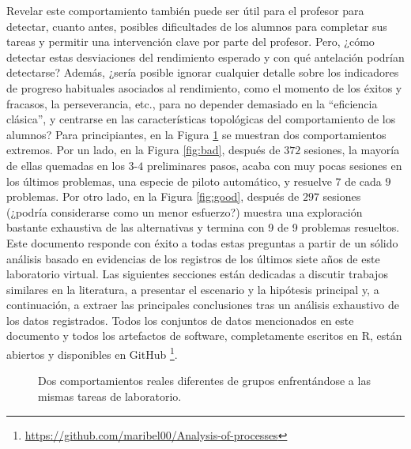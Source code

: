 Revelar este comportamiento también puede ser útil para el profesor para detectar, cuanto antes, posibles dificultades de los alumnos para completar sus tareas y permitir una intervención clave por parte del profesor. Pero, ¿cómo detectar estas desviaciones del rendimiento esperado y con qué antelación podrían detectarse? Además, ¿sería posible ignorar cualquier detalle sobre los indicadores de progreso habituales asociados al rendimiento, como el momento de los éxitos y fracasos, la perseverancia, etc., para no depender demasiado en la ``eficiencia clásica'', y centrarse en las características topológicas del comportamiento de los alumnos? Para principiantes, en la Figura \ref{fig:extreme} se muestran dos comportamientos extremos. Por un lado, en la Figura \ref{fig:bad}, después de $372$ sesiones, la mayoría de ellas quemadas en los $3$-$4$ preliminares pasos, acaba con muy pocas sesiones en los últimos problemas, una especie de piloto automático, y resuelve $7$ de cada $9$ problemas. Por otro lado, en la Figura \ref{fig:good}, después de $297$ sesiones (¿podría considerarse como un menor esfuerzo?) muestra una exploración bastante exhaustiva de las alternativas y termina con 9 de 9 problemas resueltos. Este
documento responde con éxito a todas estas preguntas a partir de un sólido análisis basado en evidencias de los registros de los últimos siete años de este laboratorio virtual. Las siguientes secciones están dedicadas a discutir trabajos similares en la literatura, a presentar el escenario y la hipótesis principal y, a continuación, a extraer las principales conclusiones tras un análisis exhaustivo de los datos registrados. Todos los conjuntos de datos mencionados en este documento y todos los artefactos de software, completamente escritos en R, están abiertos y disponibles en GitHub \footnote{\href{https://github.com/maribel00/Analysis-of-processes}{https://github.com/maribel00/Analysis-of-processes}}.

\begin{figure}[H]
\centering
{}\qquad
{}
\caption{Dos comportamientos reales diferentes de grupos enfrentándose a las mismas tareas de laboratorio.}
\label{fig:extreme}
\end{figure}

